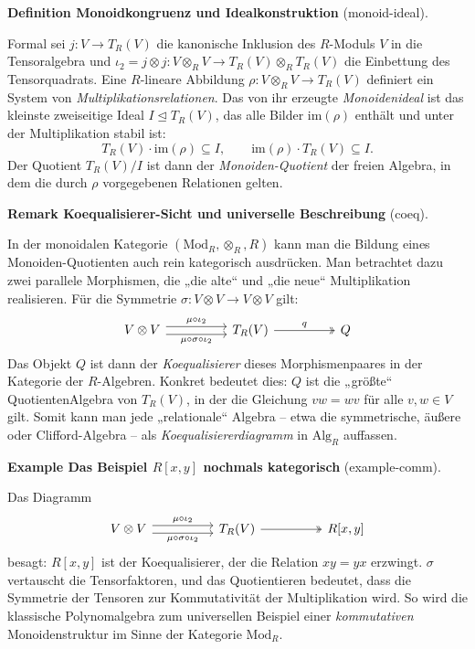 \documentclass[10pt, letterpaper]{article}
\newcommand{\Mod}{\mathrm{Mod}}
\newcommand{\Alg}{\mathrm{Alg}}
\newcommand{\CustomHeading}[3]{%
  \par\medskip\noindent%
  \textbf{#1 #2} \textnormal{(#3)}.\enskip%
}
\newenvironment{DEF}[2]{\begin{unitbox}\CustomHeading{Definition}{#1}{#2}}{\end{unitbox}}
\newenvironment{REM}[2]{\begin{unitbox}\CustomHeading{Remark}{#1}{#2}}{\end{unitbox}}
\newenvironment{EXA}[2]{\begin{unitbox}\CustomHeading{Example}{#1}{#2}}{\end{unitbox}}
\begin{document}
\begin{DEF}{Monoid\-kongruenz und Idealkonstruktion}{monoid-ideal}
Formal sei \(j:V\to T_R(V)\) die kanonische Inklusion des \(R\)-Moduls \(V\)
in die Tensoralgebra und \(\iota_2=j\otimes j:V\otimes_R V\to T_R(V)\otimes_R T_R(V)\)
die Einbettung des Tensorquadrats.
Eine \(R\)-lineare Abbildung \(\rho:V\otimes_R V\to T_R(V)\)
definiert ein System von \emph{Multiplikationsrelationen}.  
Das von ihr erzeugte \emph{Monoidenideal} ist das kleinste zweiseitige Ideal
\(I\unlhd T_R(V)\), das alle Bilder \(\mathrm{im}(\rho)\) enthält und
unter der Multiplikation stabil ist:
\[
T_R(V)\cdot \mathrm{im}(\rho)\subseteq I,\qquad \mathrm{im}(\rho)\cdot T_R(V)\subseteq I.
\]
Der Quotient \(T_R(V)/I\) ist dann der \emph{Monoiden-Quotient} der freien Algebra,
in dem die durch \(\rho\) vorgegebenen Relationen gelten.
\end{DEF}

\begin{REM}{Koequalisierer-Sicht und universelle Beschreibung}{coeq}
In der monoidalen Kategorie \((\Mod_R,\otimes_R,R)\) kann man die Bildung eines
Monoiden-Quotienten auch rein kategorisch ausdrücken.
Man betrachtet dazu zwei parallele Morphismen, die „die alte“ und „die neue“ Multiplikation
realisieren. Für die Symmetrie \(\sigma:V\otimes V\to V\otimes V\) gilt:
\[
\begin{tikzcd}[column sep=huge]
V\otimes V \arrow[r, shift left=0.7ex, "\mu\circ\iota_2"]
               \arrow[r, shift right=0.7ex, swap, "\mu\circ\sigma\circ\iota_2"]
  & T_R(V) \arrow[r, two heads, "q"] & Q
\end{tikzcd}
\]
Das Objekt \(Q\) ist dann der \emph{Koequalisierer} dieses Morphismenpaares
in der Kategorie der \(R\)-Algebren.  
Konkret bedeutet dies: \(Q\) ist die „größte“ Quotienten\-Algebra von \(T_R(V)\),
in der die Gleichung \(vw=wv\) für alle \(v,w\in V\) gilt.
Somit kann man jede „relationale“ Algebra – etwa die symmetrische, äußere oder Clifford-Algebra –
als \emph{Koequalisiererdiagramm} in \(\Alg_R\) auffassen.
\end{REM}

\begin{EXA}{Das Beispiel \(R[x,y]\) nochmals kategorisch}{example-comm}
Das Diagramm
\[
\begin{tikzcd}[column sep=huge]
V\otimes V \arrow[r, shift left=0.7ex, "\mu\circ\iota_2"]
               \arrow[r, shift right=0.7ex, swap, "\mu\circ\sigma\circ\iota_2"]
  & T_R(V) \arrow[r, two heads] & R[x,y]
\end{tikzcd}
\]
besagt: \(R[x,y]\) ist der Koequalisierer, der die Relation \(xy=yx\) erzwingt.
\(\sigma\) vertauscht die Tensorfaktoren, und das Quotientieren bedeutet,
dass die Symmetrie der Tensoren zur Kommutativität der Multiplikation wird.
So wird die klassische Polynom\-algebra zum universellen Beispiel einer
\emph{kommutativen} Monoidenstruktur im Sinne der Kategorie \(\Mod_R\).
\end{EXA}
\end{document}

